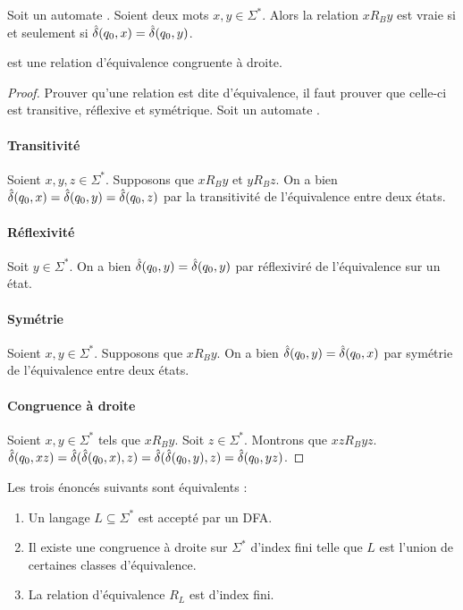 	\begin{definition}[Relation \rb]
		Soit un automate \automaton. Soient deux mots $x,y\in\Sigma^*$. Alors la relation $xR_By$ est vraie si et seulement si $\hat{\delta}(q_0,x)=\hat{\delta}(q_0,y)$.
	\end{definition}

	\begin{lemma}
		\rb est une relation d'équivalence congruente à droite.
	\end{lemma}

	\begin{proof}
		Prouver qu'une relation est dite d'équivalence, il faut prouver que celle-ci est transitive, réflexive et symétrique.
		Soit un automate \automaton.
		\paragraph{Transitivité} Soient $x,y,z\in\Sigma^*$. Supposons que $xR_By$ et $yR_Bz$. On a bien $\hat{\delta}(q_0,x)=\hat{\delta}(q_0,y)=\hat{\delta}(q_0,z)$ par la transitivité de l'équivalence entre deux états.
		\paragraph{Réflexivité} Soit $y\in\Sigma^*$. On a bien $\hat{\delta}(q_0,y)=\hat{\delta}(q_0,y)$ par réflexiviré de l'équivalence sur un état.
		\paragraph{Symétrie} Soient $x,y\in\Sigma^*$. Supposons que $xR_By$. On a bien $\hat{\delta}(q_0,y)=\hat{\delta}(q_0,x)$ par symétrie de l'équivalence entre deux états.
		\paragraph{Congruence à droite} Soient $x,y\in\Sigma^*$ tels que $xR_By$. Soit $z\in\Sigma^*$. Montrons que $xzR_Byz$. $\hat{\delta}(q_0,xz)=\hat{\delta}(\hat{\delta}(q_0,x),z)=\hat{\delta}(\hat{\delta}(q_0,y),z)=\hat{\delta}(q_0,yz)$.
	\end{proof}

	\begin{theorem}
		Les trois énoncés suivants sont équivalents :
		\begin{enumerate}
			\item Un langage $L\subseteq\Sigma^*$ est accepté par un DFA.
			\item Il existe une congruence à droite sur $\Sigma^*$ d'index fini telle que $L$ est l'union de certaines classes d'équivalence.
			\item La relation d'équivalence $R_L$ est d'index fini.
		\end{enumerate}
	\end{theorem}



